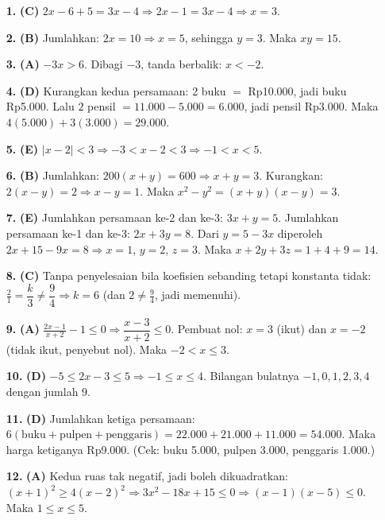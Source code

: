 \documentclass[a4paper,11pt]{article}
\newcommand{\dis}{\displaystyle}
\newcounter{no}
\begin{document}
\par{}\par\vspace{0.2em}
\small\begin{enumerate}[leftmargin=2em,itemsep=2pt,topsep=2pt]
\item[\textbf{1.}] \textbf{(C)} $2x-6+5=3x-4\Rightarrow 2x-1=3x-4\Rightarrow x=3$.
\item[\textbf{2.}] \textbf{(B)} Jumlahkan: $2x=10\Rightarrow x=5$, sehingga $y=3$. Maka $xy=15$.
\item[\textbf{3.}] \textbf{(A)} $-3x>6$. Dibagi $-3$, tanda berbalik: $x<-2$.
\item[\textbf{4.}] \textbf{(D)} Kurangkan kedua persamaan: 2 buku $=$ Rp10.000, jadi buku Rp5.000. Lalu $2$ pensil $=11.000-5.000=6.000$, jadi pensil Rp3.000. Maka $4(5.000)+3(3.000)=29.000$.
\item[\textbf{5.}] \textbf{(E)} $|x-2|<3\Rightarrow-3<x-2<3\Rightarrow-1<x<5$.
\item[\textbf{6.}] \textbf{(B)} Jumlahkan: $200(x+y)=600\Rightarrow x+y=3$. Kurangkan: $2(x-y)=2\Rightarrow x-y=1$. Maka $x^{2}-y^{2}=(x+y)(x-y)=3$.
\item[\textbf{7.}] \textbf{(E)} Jumlahkan persamaan ke-2 dan ke-3: $3x+y=5$. Jumlahkan persamaan ke-1 dan ke-3: $2x+3y=8$. Dari $y=5-3x$ diperoleh $2x+15-9x=8\Rightarrow x=1$, $y=2$, $z=3$. Maka $x+2y+3z=1+4+9=14$.
\item[\textbf{8.}] \textbf{(C)} Tanpa penyelesaian bila koefisien sebanding tetapi konstanta tidak: $\dis\frac21=\dfrac k3\neq\dfrac94\Rightarrow k=6$ (dan $2\neq\frac94$, jadi memenuhi).
\item[\textbf{9.}] \textbf{(A)} $\dis\frac{2x-1}{x+2}-1\le0\Rightarrow\dfrac{x-3}{x+2}\le0$. Pembuat nol: $x=3$ (ikut) dan $x=-2$ (tidak ikut, penyebut nol). Maka $-2<x\le3$.
\item[\textbf{10.}] \textbf{(D)} $-5\le2x-3\le5\Rightarrow-1\le x\le4$. Bilangan bulatnya $-1,0,1,2,3,4$ dengan jumlah $9$.
\item[\textbf{11.}] \textbf{(D)} Jumlahkan ketiga persamaan: $6(\text{buku}+\text{pulpen}+\text{penggaris})=22.000+21.000+11.000=54.000$. Maka harga ketiganya Rp9.000. (Cek: buku 5.000, pulpen 3.000, penggaris 1.000.)
\item[\textbf{12.}] \textbf{(A)} Kedua ruas tak negatif, jadi boleh dikuadratkan: $(x+1)^{2}\ge4(x-2)^{2}\Rightarrow3x^{2}-18x+15\le0\Rightarrow(x-1)(x-5)\le0$. Maka $1\le x\le5$.

\end{enumerate}
\end{document}
